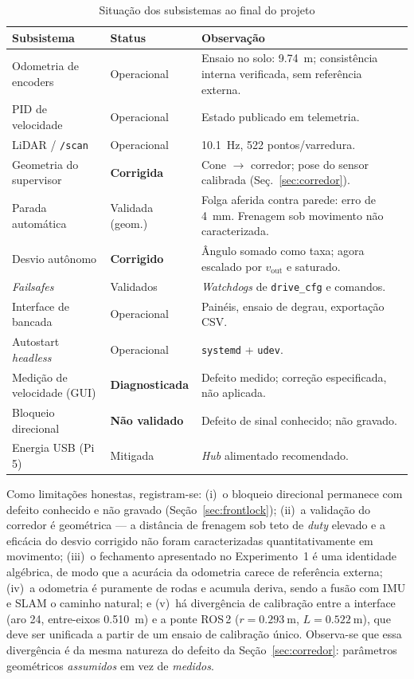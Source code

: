 \documentclass[conference]{IEEEtran}
\begin{document}
\begin{table}[!t]
\caption{Situação dos subsistemas ao final do projeto}
\label{tab:status}
\centering
\footnotesize
\renewcommand{\arraystretch}{1.2}
\begin{tabular}{@{}p{}p{}p{}@{}}
\hline
\textbf{Subsistema} & \textbf{Status} & \textbf{Observação} \\
\hline
Odometria de encoders     & Operacional  & Ensaio no solo: \SI{9.74}{\metre}; consistência interna verificada, sem referência externa. \\
PID de velocidade         & Operacional  & Estado publicado em telemetria. \\
LiDAR / \texttt{/scan}    & Operacional  & \SI{10.1}{\hertz}, \num{522} pontos/varredura. \\
Geometria do supervisor   & \textbf{Corrigida} & Cone $\to$ corredor; pose do sensor calibrada (Seç.~\ref{sec:corredor}). \\
Parada automática         & Validada (geom.) & Folga aferida contra parede: erro de \SI{4}{\milli\metre}. Frenagem sob movimento não caracterizada. \\
Desvio autônomo           & \textbf{Corrigido} & Ângulo somado como taxa; agora escalado por $v_{\text{out}}$ e saturado. \\
\emph{Failsafes}          & Validados    & \emph{Watchdogs} de \texttt{drive\_cfg} e comandos. \\
Interface de bancada      & Operacional  & Painéis, ensaio de degrau, exportação CSV. \\
Autostart \emph{headless} & Operacional  & \texttt{systemd} + \texttt{udev}. \\
Medição de velocidade (GUI) & \textbf{Diagnosticada} & Defeito medido; correção especificada, não aplicada. \\
Bloqueio direcional       & \textbf{Não validado} & Defeito de sinal conhecido; não gravado. \\
Energia USB (Pi 5)        & Mitigada     & \emph{Hub} alimentado recomendado. \\
\hline
\end{tabular}
\end{table}

Como limitações honestas, registram-se: (i)~o bloqueio direcional permanece com
defeito conhecido e não gravado (Seção~\ref{sec:frontlock}); (ii)~a validação do
corredor é geométrica --- a distância de frenagem sob teto de \emph{duty} elevado
e a eficácia do desvio corrigido não foram caracterizadas quantitativamente em
movimento; (iii)~o fechamento apresentado no Experimento~1 é uma identidade
algébrica, de modo que a acurácia da odometria carece de referência externa;
(iv)~a odometria é puramente de rodas e acumula deriva, sendo a fusão com IMU e
SLAM o caminho natural; e (v)~há divergência de calibração entre a interface
(aro \SI{24}{\inch}, entre-eixos \SI{0.510}{\metre}) e a ponte ROS\,2
($r=\SI{0.293}{\metre}$, $L=\SI{0.522}{\metre}$), que deve ser unificada a partir
de um ensaio de calibração único. Observa-se que essa divergência é da mesma
natureza do defeito da Seção~\ref{sec:corredor}: parâmetros geométricos
\emph{assumidos} em vez de \emph{medidos}.
\end{document}
